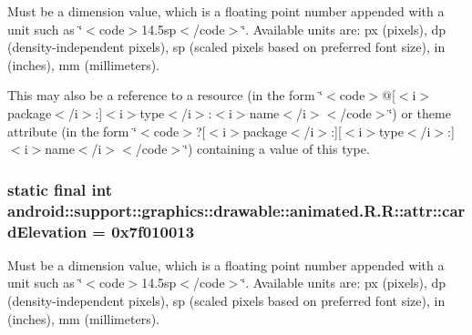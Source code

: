 Must be a dimension value, which is a floating point number appended with a unit such as \char`\"{}$<$code$>$14.5sp$<$/code$>$\char`\"{}. Available units are: px (pixels), dp (density-independent pixels), sp (scaled pixels based on preferred font size), in (inches), mm (millimeters). 

This may also be a reference to a resource (in the form \char`\"{}$<$code$>$@\mbox{[}$<$i$>$package$<$/i$>$:\mbox{]}$<$i$>$type$<$/i$>$:$<$i$>$name$<$/i$>$$<$/code$>$\char`\"{}) or theme attribute (in the form \char`\"{}$<$code$>$?\mbox{[}$<$i$>$package$<$/i$>$:\mbox{]}\mbox{[}$<$i$>$type$<$/i$>$:\mbox{]}$<$i$>$name$<$/i$>$$<$/code$>$\char`\"{}) containing a value of this type. \hypertarget{classandroid_1_1support_1_1graphics_1_1drawable_1_1animated_1_1_r_1_1attr_d2eee1d9b3112bef60388b80a8ff2d1c}{
\subsubsection[{cardElevation}]{\setlength{\rightskip}{0pt plus 5cm}static final int android::support::graphics::drawable::animated.R.R::attr::cardElevation = 0x7f010013}}
\label{classandroid_1_1support_1_1graphics_1_1drawable_1_1animated_1_1_r_1_1attr_d2eee1d9b3112bef60388b80a8ff2d1c}


Must be a dimension value, which is a floating point number appended with a unit such as \char`\"{}$<$code$>$14.5sp$<$/code$>$\char`\"{}. Available units are: px (pixels), dp (density-independent pixels), sp (scaled pixels based on preferred font size), in (inches), mm (millimeters). 

